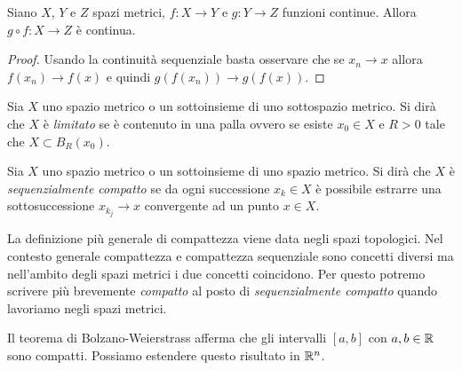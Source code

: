 \begin{theorem}%
  \label{th:continuita_funzione_composta_metrico}%
Siano $X$, $Y$ e $Z$ spazi metrici, $f\colon X\to Y$ 
e $g\colon Y\to Z$ funzioni continue. 
Allora $g\circ f\colon X\to Z$ è continua.
\end{theorem}
\begin{proof}
  Usando la continuità sequenziale basta osservare che 
  se $x_n\to x$ allora $f(x_n)\to f(x)$ e quindi $g(f(x_n))\to g(f(x))$.
\end{proof}

\begin{definition}%
  \label{def:spazio_limitato}%
\mymark{*}%
Sia $X$ uno spazio metrico o un sottoinsieme di uno sottospazio metrico. Si dirà che $X$ è
\emph{limitato}%
 se è contenuto in una palla ovvero se
esiste $x_0\in X$ e $R>0$ tale che $X\subset B_R(x_0)$.
\end{definition}

\begin{definition}%
  \label{def:sequenzialmente_compatto}%
\mymark{**}%
Sia $X$ uno spazio metrico o un sottoinsieme di uno
spazio metrico. Si dirà che $X$ è
\emph{sequenzialmente compatto}%
 se da ogni
successione $x_k \in X$ è possibile estrarre una sottosuccessione $x_{k_j}\to x$
convergente ad un punto $x\in X$.
\end{definition}

La definizione più generale di compattezza viene data negli spazi topologici.
Nel contesto generale compattezza e compattezza sequenziale sono concetti
diversi ma nell'ambito degli spazi metrici i due concetti coincidono.
Per questo potremo scrivere più brevemente \emph{compatto}%
al posto di \emph{sequenzialmente compatto} quando lavoriamo negli spazi metrici.

Il teorema di Bolzano-Weierstrass afferma che gli intervalli $[a,b]$ con
$a,b\in {\mathbb R}$ sono compatti. 
Possiamo estendere questo risultato in ${\mathbb R}^n$.

